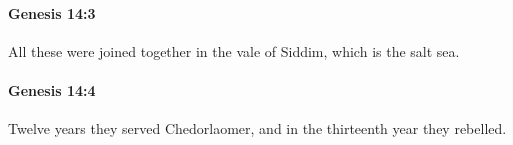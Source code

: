 		\paragraph{Genesis 14:3} %
			\label{GENESIS-14-3}

			All these were joined together in the vale of Siddim, which is the salt sea.


		\paragraph{Genesis 14:4} %
			\label{GENESIS-14-4}

			Twelve years they served Chedorlaomer, and in the thirteenth year they rebelled.



